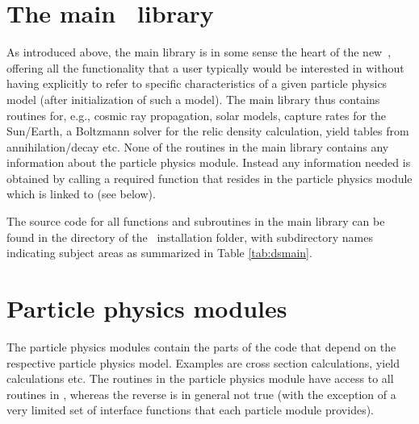 \section{The main \ds\ library }

 As introduced above, the main library is in some sense the heart of the new \ds\,,
offering all the functionality that a user typically would be interested in without having 
explicitly to refer to specific characteristics of a given particle physics model (after
initialization of such a model).
 The main library thus contains routines for, e.g., 
cosmic ray propagation, solar models, capture rates for the Sun/Earth, a 
Boltzmann solver for the relic density calculation, yield tables from annihilation/decay etc. 
None of the routines in the main library contains any information about the particle 
physics module. Instead any information needed is obtained by calling a required 
function that resides in the  particle physics module which is linked to (see below). 

The source code for all functions and subroutines in the main library can be found in the 
 directory of the \ds\ installation folder, with subdirectory names indicating  
subject areas as summarized in Table \ref{tab:dsmain}.


\section{Particle physics modules}
\label{sec:particle_modules}

 The particle physics modules contain the parts of the code that 
depend on the respective 
particle physics model. Examples are cross section calculations, yield calculations etc. 
The routines in the particle physics module have access to all routines in 
, whereas the reverse is in general not true (with the exception of a very limited 
set of interface functions that each particle module provides). 

